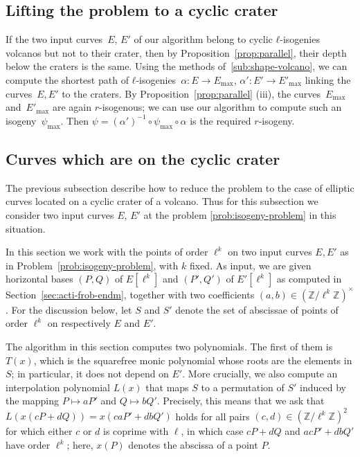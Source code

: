 \documentclass{lms}
\begin{document}
\subsection{Lifting the problem to a cyclic crater}

If the two input curves~$E$, $E'$ of our algorithm
belong to cyclic $ℓ$-isogenies volcanos but not to their crater,
then by Proposition~\ref{prop:parallel},
their depth below the craters is the same.
Using the methods of~\ref{sub:shape-volcano},
we can compute the shortest path of $ℓ$-isogenies~$α: E → E_{\max}$,
$α': E' → E'_{\max}$ linking the curves~$E, E'$ to the craters.
By Proposition~\ref{prop:parallel} (iii),
the curves~$E_{\max}$ and~$E'_{\max}$ are again $r$-isogenous;
we can use our algorithm to compute such an isogeny~$ψ_{\max}$.
Then $ψ = (α')^{-1} ∘ ψ_{\max} ∘ α$ is the required $r$-isogeny.

 \subsection{Curves which are on the cyclic crater}
 The previous subsection describe how to reduce the problem to the case of elliptic curves located on a cyclic crater of a volcano. Thus for this subsection we consider two input curves $E$, $E'$ at the problem \ref{prob:isogeny-problem} in this situation. 


In this section we work with the points of order $\ell^k$ on two input
curves $E,E'$ as in Problem~\ref{prob:isogeny-problem}, with $k$ fixed.
As input, we are given horizontal bases $(P,Q)$ of $E[\ell^k]$ and
$(P',Q')$ of $E'[\ell^k]$ as computed in
Section~\ref{sec:acti-frob-endm}, together with two coefficients $(a,b)
\in \left(\mathbb{Z}/\ell^k \mathbb{Z} \right)^{\times}$. For the discussion below,
let $S$ and $S'$ denote the set of abscissae of points of order
$\ell^k$ on respectively $E$ and $E'$.

The algorithm in this section computes two polynomials. The first of
them is $T(x)$, which is the squarefree monic polynomial whose roots
are the elements in $S$; in particular, it does not depend on
$E'$. More crucially, we also compute an interpolation polynomial
$L(x)$ that maps $S$ to a permutation of $S'$ induced by the mapping
$P \mapsto aP'$ and $Q \mapsto bQ'$.  Precisely, this means that we
ask that $L(x(cP+dQ))=x(caP'+dbQ')$ holds for all pairs $(c,d) \in
(\mathbb{Z}/\ell^k\mathbb{Z})^2$ for which either $c$ or $d$ is
coprime with $\ell$, in which case $cP+dQ$ and $acP'+dbQ'$ have order
$\ell^k$; here, $x(P)$ denotes the abscissa of a point $P$.
\end{document}
